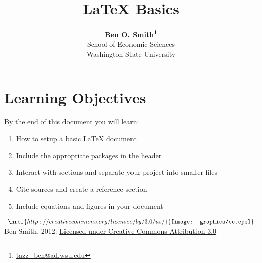 \documentclass[11pt]{article}
\begin{document}
 

\title{LaTeX Basics}
\date{}
\author{\textbf{Ben O. Smith\footnote{\href{mailto:tazz_ben@ad.wsu.edu}{tazz\_ben@ad.wsu.edu}}} \\
School of Economic Sciences \\
Washington State University}
\maketitle 

\section*{Learning Objectives}

By the end of this document you will learn:

\begin{enumerate}
	\item How to setup a basic LaTeX document
	\item Include the appropriate packages in the header
	\item Interact with sections and separate your project into smaller files
	\item Cite sources and create a reference section
	\item Include equations and figures in your document
\end{enumerate}

\doublespace







\printbibliography[title=Bibliography]
\vspace{\fill}
\noindent $ \begin{array}{l} \href{http://creativecommons.org/licenses/by/3.0/us/}{\texttt{[image: graphics/cc.eps]}} \end{array} $ Ben Smith, 2012: \href{http://creativecommons.org/licenses/by/3.0/us/}{Licensed under Creative Commons Attribution 3.0}
\end{document}
